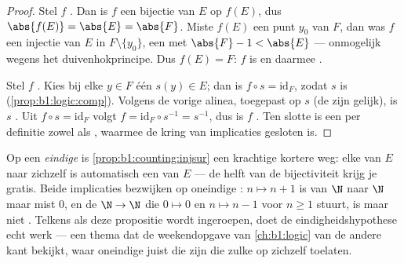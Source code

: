 \begin{proof}
Stel $f$ . Dan is $f$ een bijectie van $E$ op $f(E)$, dus
$\abs{f(E)} = \abs{E} = \abs{F}$. Miste $f(E)$ een punt $y_0$ van $F$,
dan was $f$ een injectie van $E$ in $F \setminus \{y_0\}$, een
 met  $\abs{F} - 1 < \abs{E}$ --- onmogelijk
wegens het duivenhokprincipe. Dus $f(E) = F$: $f$ is  en
daarmee .

Stel $f$ . Kies bij elke $y \in F$ één  $s(y) \in E$;
dan is $f \circ s = \mathrm{id}_F$, zodat $s$  is
(\cref{prop:b1:logic:comp}). Volgens de vorige alinea, toegepast op $s$
(de  zijn gelijk), is $s$ . Uit $f \circ s =
\mathrm{id}_F$ volgt $f = \mathrm{id}_F \circ s^{-1} = s^{-1}$, dus is
$f$ . Ten slotte is een   per definitie
zowel  als , waarmee de kring van implicaties gesloten
is.
\end{proof}

\begin{example}\label{ex:b1:counting:finiteonly}
Op een \emph{eindige}  is \cref{prop:b1:counting:injsur} een
krachtige kortere weg: elke   van $E$ naar zichzelf
is automatisch een  van $E$ --- de helft van de bijectiviteit
krijg je gratis. Beide implicaties bezwijken op oneindige :
$n \mapsto n + 1$ is  van $\N$ naar $\N$ maar mist $0$, en de
 $\N \to \N$ die $0 \mapsto 0$ en $n \mapsto n - 1$ voor $n
\geq 1$ stuurt, is  maar niet . Telkens als deze
propositie wordt ingeroepen, doet de eindigheidshypothese echt werk ---
een thema dat de weekendopgave van \cref{ch:b1:logic} van de andere kant
bekijkt, waar oneindige  juist die  zijn die
zulke  op zichzelf toelaten.
\end{example}


